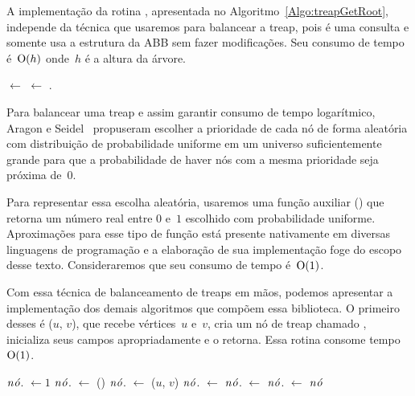 A implementação da rotina \treapGetRoot{}, apresentada no Algoritmo~\ref{Algo:treapGetRoot}, independe da técnica que usaremos para balancear a treap,
pois é uma consulta e somente usa a estrutura da ABB sem fazer modificações.
Seu consumo de tempo é~$\mathrm{O}(h)$ onde~$h$ é a altura da árvore.

\begin{algorithm}[htb]
\caption{\treapGetRoot()}
\label{Algo:treapGetRoot}
\begin{algorithmic}[1]
\State {} $\gets$ 
\State  {} $\gets$  .
\EndWhile
\State \Return {}
\end{algorithmic}
\end{algorithm}

Para balancear uma treap e assim garantir consumo de tempo logarítmico, Aragon e Seidel~\cite{AragonSeidel1989, AragonSeidel1996} propuseram escolher a prioridade de cada nó de forma aleatória com distribuição de probabilidade uniforme em um universo suficientemente grande para que a probabilidade de haver nós com a mesma prioridade seja próxima de~$0$.


Para representar essa escolha aleatória, usaremos uma função auxiliar \random() que retorna um número real entre $0$ e~$1$ escolhido com probabilidade uniforme.
Aproximações para esse tipo de função está presente nativamente em diversas linguagens de programação e a elaboração de sua implementação foge do escopo desse texto. Consideraremos que seu consumo de tempo é~$\mathrm{O}(1)$.

Com essa técnica de balanceamento de treaps em mãos, podemos apresentar a implementação dos demais algoritmos que compõem essa biblioteca.
O primeiro desses é \treapCreate($u$, $v$), que recebe vértices~$u$ e~$v$, cria um nó de treap chamado , inicializa seus campos apropriadamente e o retorna.
Essa rotina consome tempo~$\mathrm{O}(1)$. 

\begin{algorithm}
\caption{\treapCreate($u$, $v$)}
\label{Algo:TREAPbuild}
\begin{algorithmic}[1]
\State $\mathit{n\acute{o}}$. $\gets 1$
\State $\mathit{n\acute{o}}$. $\gets$ \random() 
\State $\mathit{n\acute{o}}$. $\gets$ ($u$, $v$)
\State $\mathit{n\acute{o}}$. $\gets$ $\mathit{n\acute{o}}$. $\gets$ $\mathit{n\acute{o}}$. $\gets$ \Nil
\State \Return $\mathit{n\acute{o}}$
\end{algorithmic}
\end{algorithm}

